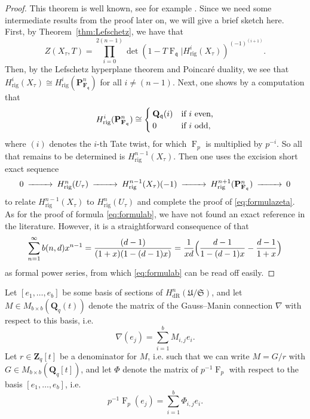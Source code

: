 \documentclass[a4paper,11pt]{article}
\numberwithin{equation}{section}
\newcommand{\ZZ}{\mathbf{Z}} %
\newcommand{\QQ}{\mathbf{Q}} %
\newcommand{\FF}{\mathbf{F}} %
\DeclareMathOperator{\Frob}{F}           %
\providecommand{\HdR}{H_{\text{dR}}}    %
\providecommand{\Hrig}{H_{\text{rig}}}  %
\theoremstyle{definition}
\begin{document}
\begin{proof}
This theorem is well known, see for example \cite{AbbottKedlayaRoe2006}. Since we need some intermediate results from the
proof later on, we will give a brief sketch here. First, by Theorem~\ref{thm:Lefschetz}, we have that
\[
Z(X_{\tau},T) = \prod_{i=0}^{2(n-1)} \det(1- T \Frob_{\mathfrak{q}} | \Hrig^i(X_{\tau}))^{(-1)^{(i+1)}}.
\]
Then, by the Lefschetz hyperplane theorem and Poincar\'e duality, we see that $\Hrig^i(X_{\tau}) \cong \Hrig^i(\mathbf{P}^n_{\FF_{\mathfrak{q}}})$ 
for all $i \neq (n-1)$. Next, one shows by a computation that
\begin{equation} \label{eqn:projcoho}
\Hrig^i(\mathbf{P}^n_{\FF_{\mathfrak{q}}}) 
\cong 
\begin{cases}
\QQ_{\mathfrak{q}}(i) &\mbox{if $i$ even,} \\
$0$ &\mbox{if $i$ odd,} 
\end{cases} 
\end{equation}
where $(i)$ denotes the $i$-th Tate twist, for which $\Frob_p$ is multiplied by $p^{-i}$. So all that remains to be determined is $\Hrig^{n-1}(X_{\tau})$. 
Then one uses the excision short exact sequence
\begin{equation} \label{eqn:excision}
\begin{CD}
0 @>>> \Hrig^{n}(U_{\tau}) @>>> \Hrig^{n-1}(X_{\tau})(-1) @>>> \Hrig^{n+1}(\mathbf{P}^n_{\FF_{\mathfrak{q}}}) @>>> 0
\end{CD} 
\end{equation}
to relate $\Hrig^{n-1}(X_{\tau})$ to $\Hrig^{n}(U_{\tau})$ and complete the proof of \eqref{eq:formulazeta}. As for 
the proof of formula \eqref{eq:formulab}, we have not found an exact reference in the literature. However, it is
a straightforward consequence of \cite[Corollaire 2.4 (i)]{sga7} that
\[
\sum_{n=1}^{\infty} b(n,d) x^{n-1} = \frac{(d-1)}{(1+x)(1-(d-1)x)} = \frac{1}{xd} \Bigl( \frac{d-1}{1-(d-1)x} - \frac{d-1}{1+x} \Bigr)
\] 
as formal power series, from which \eqref{eq:formulab} can be read off easily. 
\end{proof}

Let $[e_1, \ldots, e_b]$ be some basis of sections of $\HdR^n(\mathfrak{U}/\mathfrak{S})$, and let 
$M \in M_{b \times b}(\QQ_q(t))$ denote the matrix of the Gauss--Manin connection $\nabla$ with respect 
to this basis, i.e.\ 
\[
\nabla (e_j) = \sum_{i=1}^b M_{i,j} e_i.
\]
Let $r \in \ZZ_q[t]$ be a denominator for $M$, i.e. such that we can write $M=G/r$ with $G \in M_{b \times b}(\QQ_q[t])$, 
and let $\Phi$ denote the matrix of $p^{-1}\Frob_p$ with respect to the basis $[e_1, \ldots, e_b]$, i.e.\
\[
p^{-1} \Frob_p (e_j) = \sum_{i=1}^b \Phi_{i,j} e_i.
\]
\end{document}
